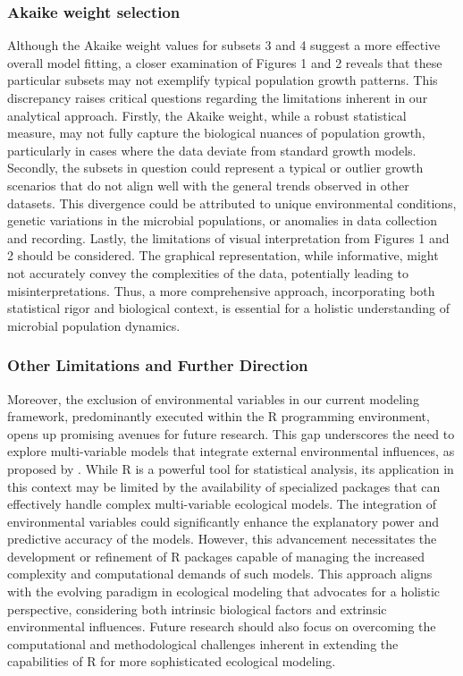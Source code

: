 \documentclass[11pt]{article}
\begin{document}
\subsubsection{Akaike weight selection}
Although the Akaike weight values for subsets 3 and 4 suggest a more effective overall model fitting, a closer examination of Figures 1 and 2 reveals that these particular subsets may not exemplify typical population growth patterns. This discrepancy raises critical questions regarding the limitations inherent in our analytical approach. Firstly, the Akaike weight, while a robust statistical measure, may not fully capture the biological nuances of population growth, particularly in cases where the data deviate from standard growth models\cite{Wagenmakers2004}. Secondly, the subsets in question could represent a typical or outlier growth scenarios that do not align well with the general trends observed in other datasets. This divergence could be attributed to unique environmental conditions, genetic variations in the microbial populations, or anomalies in data collection and recording. Lastly, the limitations of visual interpretation from Figures 1 and 2 should be considered. The graphical representation, while informative, might not accurately convey the complexities of the data, potentially leading to misinterpretations. Thus, a more comprehensive approach, incorporating both statistical rigor and biological context, is essential for a holistic understanding of microbial population dynamics.

\subsubsection{Other Limitations and Further Direction}
Moreover, the exclusion of environmental variables in our current modeling framework, predominantly executed within the R programming environment, opens up promising avenues for future research. This gap underscores the need to explore multi-variable models that integrate external environmental influences, as proposed by \cite{Micha2011}. While R is a powerful tool for statistical analysis, its application in this context may be limited by the availability of specialized packages that can effectively handle complex multi-variable ecological models. The integration of environmental variables could significantly enhance the explanatory power and predictive accuracy of the models. However, this advancement necessitates the development or refinement of R packages capable of managing the increased complexity and computational demands of such models. This approach aligns with the evolving paradigm in ecological modeling that advocates for a holistic perspective, considering both intrinsic biological factors and extrinsic environmental influences. Future research should also focus on overcoming the computational and methodological challenges inherent in extending the capabilities of R for more sophisticated ecological modeling.
\end{document}
